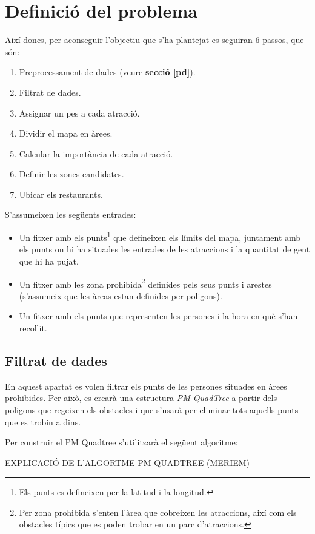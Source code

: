 \documentclass[12pt]{article}
\begin{document}
\clearpage
\section{Definició del problema}
Així doncs, per aconseguir l'objectiu que s'ha plantejat es seguiran 6 passos, que són:
\begin{enumerate}
	\item Preprocessament de dades (veure \textbf{secció \ref{pd}}).
	\item Filtrat de dades.
	\item Assignar un pes a cada atracció.
	\item Dividir el mapa en àrees.
	\item Calcular la importància de cada atracció.
	\item Definir les zones candidates.
	\item Ubicar els restaurants.
\end{enumerate}

S'assumeixen les següents entrades:
\begin{itemize}
	\item Un fitxer amb els punts\footnote{Els punts es defineixen per la latitud i la longitud.} que defineixen els límits del mapa, juntament amb els punts on hi ha situades les entrades de les atraccions i la quantitat de gent que hi ha pujat.
	\item Un fitxer amb les zona prohibida\footnote{Per zona prohibida s'enten l'àrea que cobreixen les atraccions, així com els obstacles típics que es poden trobar en un parc d'atraccions.} definides pels seus punts i arestes (s'assumeix que les àreas estan definides per poligons).
	\item Un fitxer amb els punts que representen les persones i la hora en què s'han recollit.
\end{itemize}

\subsection{Filtrat de dades}
En aquest apartat es volen filtrar els punts de les persones situades en àrees prohibides. Per això, es crearà una estructura \textit{PM QuadTree} a partir dels poligons que regeixen els obstacles i que s'usarà per eliminar tots aquells punts que es trobin a dins.

Per construir el PM Quadtree s'utilitzarà el següent algoritme:

EXPLICACIÓ DE L'ALGORTME PM QUADTREE (MERIEM)
\end{document}
